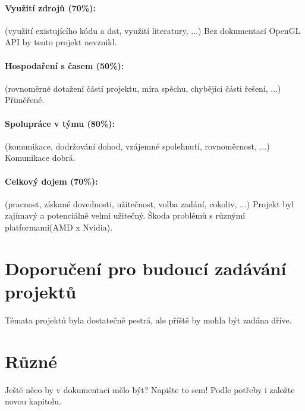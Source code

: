 \documentclass[11pt,a4paper]{article}
\begin{document}
\paragraph{Využití zdrojů (70\%):} (využití existujícího kódu a dat, využití
literatury, $\ldots$)
Bez dokumentací OpenGL API by tento projekt nevznikl.

\paragraph{Hospodaření s časem (50\%):} (rovnoměrné dotažení částí projektu,
míra spěchu, chybějící části řešení, $\ldots$)
Přiměřené. 

\paragraph{Spolupráce v týmu (80\%):} (komunikace, dodržování dohod, vzájemné
spolehnutí, rovnoměrnost, $\ldots$)
Komunikace dobrá.

\paragraph{Celkový dojem (70\%):} (pracnost, získané dovednosti, užitečnost,
volba zadání, cokoliv, $\ldots$)
Projekt byl zajímavý a potenciálně velmi užitečný. Škoda problémů s různými platformami(AMD x Nvidia).

\section{Doporučení pro budoucí zadávání projektů}

Témata projektů byla dostatečně pestrá, ale příště by mohla být zadána dříve.

\section{Různé}

Ještě něco by v dokumentaci mělo být? Napište to sem! Podle potřeby i založte
novou kapitolu.
\end{document}
